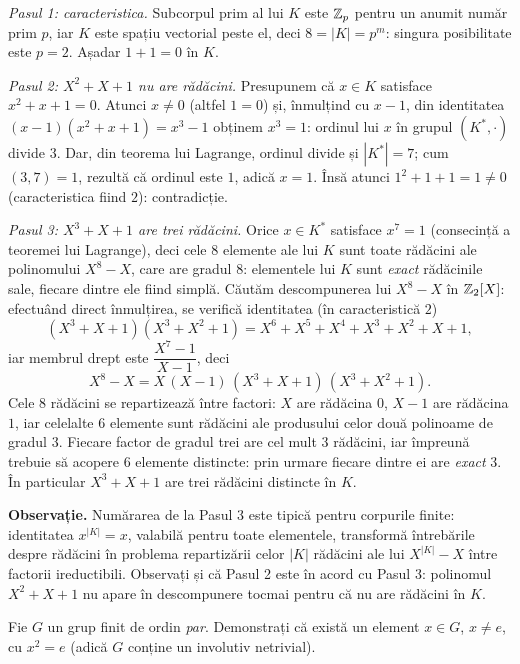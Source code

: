 \begin{solutie}
\emph{Pasul 1: caracteristica.} Subcorpul prim al lui $K$ este $\mathbb{Z}_p$ pentru un anumit număr prim $p$, iar $K$ este spațiu vectorial peste el, deci $8=|K|=p^m$: singura posibilitate este $p=2$. Așadar $1+1=0$ în $K$.

\emph{Pasul 2: $X^2+X+1$ nu are rădăcini.} Presupunem că $x\in K$ satisface $x^2+x+1=0$. Atunci $x\neq 0$ (altfel $1=0$) și, înmulțind cu $x-1$, din identitatea $(x-1)(x^2+x+1)=x^3-1$ obținem $x^3=1$: ordinul lui $x$ în grupul $(K^*,\cdot)$ divide $3$. Dar, din teorema lui Lagrange, ordinul divide și $|K^*|=7$; cum $(3,7)=1$, rezultă că ordinul este $1$, adică $x=1$. Însă atunci $1^2+1+1=1\neq 0$ (caracteristica fiind $2$): contradicție.

\emph{Pasul 3: $X^3+X+1$ are trei rădăcini.} Orice $x\in K^*$ satisface $x^7=1$ (consecință a teoremei lui Lagrange), deci cele $8$ elemente ale lui $K$ sunt toate rădăcini ale polinomului $X^8-X$, care are gradul $8$: elementele lui $K$ sunt \emph{exact} rădăcinile sale, fiecare dintre ele fiind simplă. Căutăm descompunerea lui $X^8-X$ în $\mathbb{Z}_2[X]$: efectuând direct înmulțirea, se verifică identitatea (în caracteristică $2$)
\[
(X^3+X+1)(X^3+X^2+1)=X^6+X^5+X^4+X^3+X^2+X+1,
\]
iar membrul drept este $\dfrac{X^7-1}{X-1}$, deci
\[
X^8-X=X\,(X-1)\,(X^3+X+1)\,(X^3+X^2+1).
\]
Cele $8$ rădăcini se repartizează între factori: $X$ are rădăcina $0$, $X-1$ are rădăcina $1$, iar celelalte $6$ elemente sunt rădăcini ale produsului celor două polinoame de gradul $3$. Fiecare factor de gradul trei are cel mult $3$ rădăcini, iar împreună trebuie să acopere $6$ elemente distincte: prin urmare fiecare dintre ei are \emph{exact} $3$. În particular $X^3+X+1$ are trei rădăcini distincte în $K$.

\medskip
\noindent\textbf{Observație.} Numărarea de la Pasul 3 este tipică pentru corpurile finite: identitatea $x^{|K|}=x$, valabilă pentru toate elementele, transformă întrebările despre rădăcini în problema repartizării celor $|K|$ rădăcini ale lui $X^{|K|}-X$ între factorii ireductibili. Observați și că Pasul 2 este în acord cu Pasul 3: polinomul $X^2+X+1$ nu apare în descompunere tocmai pentru că nu are rădăcini în $K$.
\end{solutie}

\begin{problema}[Clasică]
Fie $G$ un grup finit de ordin \emph{par}. Demonstrați că există
un element $x \in G$, $x \neq e$, cu $x^{2}=e$ (adică $G$ conține
un involutiv netrivial).
\end{problema}

